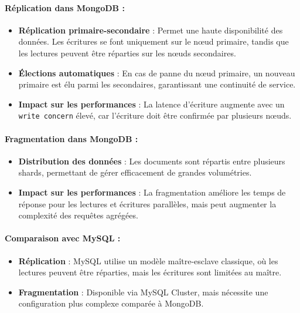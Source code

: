 \documentclass[a4paper,12pt]{report}
\begin{document}
\paragraph{Réplication dans MongoDB :}
\begin{itemize}
    \item \textbf{Réplication primaire-secondaire} : Permet une haute disponibilité des données. Les écritures se font uniquement sur le nœud primaire, tandis que les lectures peuvent être réparties sur les nœuds secondaires.
    \item \textbf{Élections automatiques} : En cas de panne du nœud primaire, un nouveau primaire est élu parmi les secondaires, garantissant une continuité de service.
    \item \textbf{Impact sur les performances} : La latence d'écriture augmente avec un \texttt{write concern} élevé, car l'écriture doit être confirmée par plusieurs nœuds.
\end{itemize}

\paragraph{Fragmentation dans MongoDB :}

\begin{itemize}
    \item \textbf{Distribution des données} : Les documents sont répartis entre plusieurs shards, permettant de gérer efficacement de grandes volumétries.
    \item \textbf{Impact sur les performances} : La fragmentation améliore les temps de réponse pour les lectures et écritures parallèles, mais peut augmenter la complexité des requêtes agrégées.
\end{itemize}


\paragraph{Comparaison avec MySQL :}

\begin{itemize}
    \item \textbf{Réplication} : MySQL utilise un modèle maître-esclave classique, où les lectures peuvent être réparties, mais les écritures sont limitées au maître.
    \item \textbf{Fragmentation} : Disponible via MySQL Cluster, mais nécessite une configuration plus complexe comparée à MongoDB.
\end{itemize}
\end{document}

